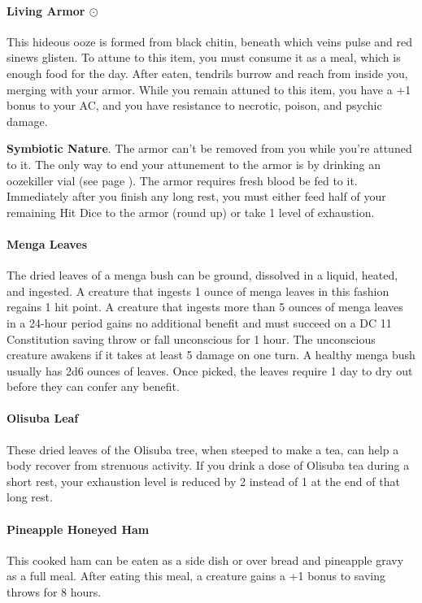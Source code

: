     \paragraph{Living Armor $\odot$} \label{item::livingarmor}
        This hideous ooze is formed from black chitin, beneath which veins pulse and red sinews glisten.
        To attune to this item, you must consume it as a meal, which is enough food for the day.
        After eaten, tendrils burrow and reach from inside you, merging with your armor.
        While you remain attuned to this item, you have a +1 bonus to your AC, and you have resistance to necrotic, poison, and psychic damage.

        \textbf{Symbiotic Nature}.
        The armor can't be removed from you while you're attuned to it.
        The only way to end your attunement to the armor is by drinking an oozekiller vial (see page \pageref{item::oozekiller}).
        The armor requires fresh blood be fed to it.
        Immediately after you finish any long rest, you must either feed half of your remaining Hit Dice to the armor (round up) or take 1 level of exhaustion.
    \paragraph{Menga Leaves}
        The dried leaves of a menga bush can be ground, dissolved in a liquid, heated, and ingested.
        A creature that ingests 1 ounce of menga leaves in this fashion regains 1 hit point.
        A creature that ingests more than 5 ounces of menga leaves in a 24-hour period gains no additional benefit and must succeed on a DC 11 Constitution saving throw or fall unconscious for 1 hour.
        The unconscious creature awakens if it takes at least 5 damage on one turn.
        A healthy menga bush usually has 2d6 ounces of leaves.
        Once picked, the leaves require 1 day to dry out before they can confer any benefit.
    \paragraph{Olisuba Leaf}
        These dried leaves of the Olisuba tree, when steeped to make a tea, can help a body recover from strenuous activity.
        If you drink a dose of Olisuba tea during a short rest, your exhaustion level is reduced by 2 instead of 1 at the end of that long rest.
    \paragraph{Pineapple Honeyed Ham}
        This cooked ham can be eaten as a side dish or over bread and pineapple gravy as a full meal.
        After eating this meal, a creature gains a +1 bonus to saving throws for 8 hours.

